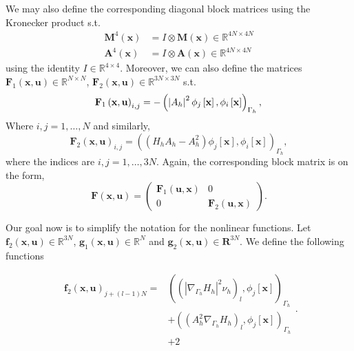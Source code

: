 We may also define the corresponding diagonal block matrices using the Kronecker product s.t.
\[
    \begin{split}
        \mathbf{M}^{4}( \mathbf{x} )  &= I \otimes \mathbf{M}( \mathbf{x}) \in \mathbb{R} ^{4N \times 4N} \\
\mathbf{A}^{4}( \mathbf{x} )   & = I \otimes \mathbf{A}( \mathbf{x}
) \in \mathbb{R} ^{4N \times 4N}
    \end{split}
\]
using the identity $I \in \mathbb{R} ^{4\times 4}$. Moreover, we can also define the matrices $\mathbf{F}_{1} \left( \mathbf{x}, \mathbf{u} \right) \in  \mathbb{R}^{N \times N} $, $\mathbf{F}_{2} \left( \mathbf{x}, \mathbf{u} \right) \in
\mathbb{R}^{3N \times 3N} $  s.t.
\[
    \mathbf{F}_{1}\left( \mathbf{x},\mathbf{u} \right)_{i,j}    = - \left( \left\lvert A_{h} \right\rvert^2  \phi_{j} \left[ \mathbf{x} \right] , \phi_{i} \left[ \mathbf{x} \right]  \right)_{\Gamma _{h}},  \\
\]
Where $i,j = 1,\ldots,N $ and similarly,
\[
    \mathbf{F}_{2}\left( \mathbf{x},\mathbf{u} \right)_{i,j}    =  \left( (H_{h} A_{h} - A^2_{h})  \phi_{j} \left[ \mathbf{x} \right] , \phi_{i} \left[ \mathbf{x} \right]  \right)_{\Gamma _{h}},
\]
where the indices are $i,j = 1,\ldots, 3N$.
 Again, the corresponding block matrix is on the form,
\[
\mathbf{F}\left( \mathbf{x}, \mathbf{u} \right) = \begin{pmatrix}
\mathbf{F}_{1}( \mathbf{u}, \mathbf{x} ) &  0 \\
0 &  \mathbf{F}_{2}(\mathbf{u}, \mathbf{x})
\end{pmatrix}.
\]

Our goal now is to simplify the notation for the nonlinear functions. Let $\mathbf{f}_{2}( \mathbf{x}, \mathbf{u}) \in  \mathbb{R} ^{3N} $, $\mathbf{g}_{1}( \mathbf{x}, \mathbf{u}) \in \mathbb{R} ^{N} $ and $\mathbf{g}_{2}( \mathbf{x} , \mathbf{u})
\in \mathbf{R}^{3N} $. We define the following functions

\begin{equation*}
    \begin{split}
        \mathbf{f}_{2}( \mathbf{x}, \mathbf{u})_{j+(l-1)N} =& ( ( \left\lvert \nabla _{\Gamma _{h}} H_{h} \right\rvert ^2 \nu _{h})_{l} , \phi_{j}\left[ \mathbf{x} \right]   ) _{\Gamma _{h}}   \\
        & + ((A_{h}^2 \nabla _{\Gamma _{h}}H_{h})_{l}, \phi _{j} \left[ \mathbf{x} \right]  )_{\Gamma _{h}} \\ 
        & + 2
    \end{split}
.\end{equation*}

